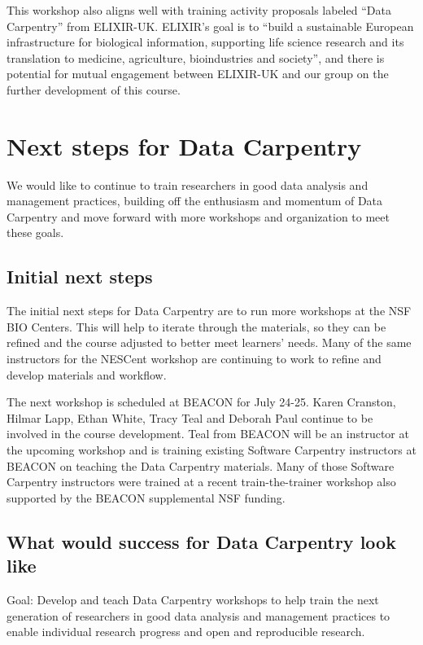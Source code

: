 \documentclass[11pt]{article}
\begin{document}
This workshop also aligns well with training activity proposals labeled ``Data Carpentry'' from ELIXIR-UK. ELIXIR's goal is to ``build a sustainable European infrastructure for biological information, supporting life science research and its translation to medicine, agriculture, bioindustries and society'', and there is potential for mutual engagement between ELIXIR-UK and our group on the further development of this course. 

\section{Next steps for Data Carpentry}

We would like to continue to train researchers in good data analysis and management practices, building off the enthusiasm and momentum of Data Carpentry and move forward with more workshops and organization to meet 
these goals.

\subsection{Initial next steps}

The initial next steps for Data Carpentry are to run more workshops at the NSF BIO Centers. This will help to 
iterate through the materials, so they can be refined and the course adjusted to better meet learners' needs. Many of the same instructors for the NESCent workshop are continuing to work to refine and develop materials and workflow.

The next workshop is scheduled at BEACON for July 24-25. Karen Cranston, Hilmar Lapp, Ethan White, Tracy Teal and Deborah Paul continue to be involved in the course development. Teal from BEACON will be an instructor at the upcoming workshop and is training existing Software Carpentry instructors at BEACON on teaching the Data Carpentry materials. Many of those Software Carpentry instructors were trained at a recent train-the-trainer workshop also supported by the BEACON supplemental NSF funding. 

\subsection{What would success for Data Carpentry look like}

\hangindent=0.7cm Goal: Develop and teach Data Carpentry workshops to help train the next generation of researchers in good data analysis and management practices to enable individual research progress and open and reproducible research. 
\end{document}

